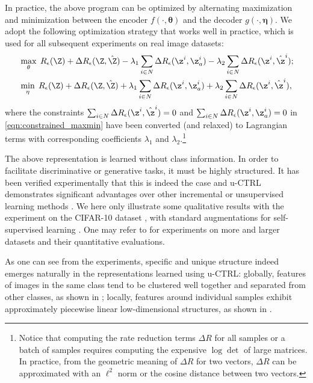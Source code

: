 \documentclass[../../book-main.tex]{subfiles}
\begin{document}
In practice, the above program can be optimized by alternating maximization and minimization between the encoder $f(\cdot,\bm \theta)$ and the decoder $g(\cdot,\bm \eta)$. We adopt the following optimization strategy that works well in practice, which is used for all subsequent experiments on real image datasets:
\vspace{-1mm}
\begin{align}
  &  \max_{\theta}\; R_\epsilon(\Z) + \Delta{R_\epsilon(\Z, \hat{\Z})-\lambda_{1}\sum_{i\in N} \Delta R_\epsilon(\z^i, \z_{a}^i)} -\lambda_{2}\sum_{i\in N} \Delta R_\epsilon(\z^i, \hat{\z}^i) \label{eqn:constrained_max}; \\
   & \min_{\eta}\; R_\epsilon(\Z) + \Delta{R_\epsilon(\Z, \hat{\Z})+\lambda_{1}\sum_{i\in N} \Delta R_\epsilon(\z^i, \z_{a}^i)+ \lambda_{2}\sum_{i\in N} \Delta R_\epsilon(\z^i, \hat{\z}^i)} \label{eqn:constrained_min}, 
\end{align}
where the constraints $\sum_{i\in N} \Delta R_\epsilon(\z^i, \hat{\z}^i) = 0$ and $\sum_{i\in N} \Delta R_\epsilon(\z^i, \z_{a}^i) = 0$ in \eqref{eqn:constrained_maxmin} have been converted (and relaxed) to Lagrangian terms with corresponding coefficients $\lambda_{1}$ and  $\lambda_{2}$.\footnote{Notice that computing the rate reduction terms $\Delta R$ for all samples or a batch of samples requires computing the expensive $\log\det$ of large matrices. In practice, from the geometric meaning of $\Delta R$ for two vectors, $\Delta R$ can be approximated with an $\ell^2$ norm or the cosine distance between two vectors.}

The above representation is learned without class information. In order to facilitate discriminative or generative tasks, it must be highly structured. It has been verified experimentally that this is indeed the case and u-CTRL demonstrates significant advantages over other incremental or unsupervised learning methods \cite{pmlr-v234-tong24a}. We here only illustrate some qualitative results with the experiment on the CIFAR-10 dataset \cite{krizhevsky2014cifar}, with standard augmentations for self-supervised learning \cite{chen2020simple}. One may refer to \cite{pmlr-v234-tong24a} for experiments on more and larger datasets and their quantitative evaluations. 

As one can see from the experiments, specific and unique structure indeed emerges naturally in the representations learned using u-CTRL: globally, features of images in the same class tend to be clustered well together and separated from other classes, as shown in ; locally, features around individual samples exhibit approximately piecewise linear low-dimensional structures, as shown in . 
\end{document}
